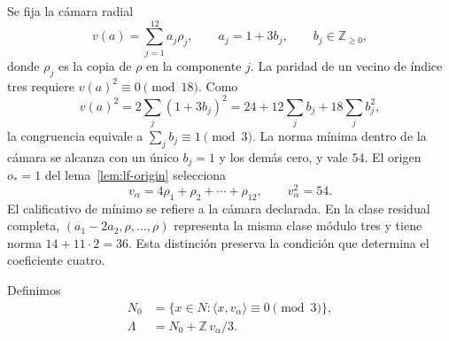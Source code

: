 \documentclass[a4paper,10pt]{article}
\theoremstyle{definition}\newtheorem{definition}[theorem]{Definición}
\theoremstyle{remark}\newtheorem{remark}[theorem]{Observación}
\numberwithin{equation}{section}
\begin{document}
Se fija la cámara radial
\[
 v(a)=\sum_{j=1}^{12}a_j\rho_j,\qquad
 a_j=1+3b_j,\qquad b_j\in\mathbb Z_{\geq0},
\]
donde \(\rho_j\) es la copia de \(\rho\) en la
componente \(j\). La paridad de un vecino de índice
tres requiere \(v(a)^2\equiv0\pmod{18}\).
Como
\[
 v(a)^2=2\sum_j(1+3b_j)^2
       =24+12\sum_jb_j+18\sum_jb_j^2,
\]
la congruencia equivale a \(\sum_jb_j\equiv1\pmod3\).
La norma mínima dentro de la cámara se alcanza con
un único \(b_j=1\) y los demás cero, y vale \(54\).
El origen \(o_*=1\) del lema~\ref{lem:lf-origin}
selecciona
\begin{equation}
 v_\alpha=4\rho_1+\rho_2+\cdots+\rho_{12},
 \qquad v_\alpha^2=54.
 \label{eq:lf-valpha}
\end{equation}
El calificativo de mínimo se refiere a la cámara
declarada. En la clase residual completa,
\((a_1-2a_2,\rho,\ldots,\rho)\) representa la
misma clase módulo tres y tiene norma
\(14+11\cdot2=36\). Esta distinción preserva
la condición que determina el coeficiente cuatro.

Definimos
\begin{equation}
\begin{split}
 N_0&=\{x\in N:\langle x,v_\alpha\rangle\equiv0\pmod3\},\\
 \Lambda&=N_0+\mathbb Z\,v_\alpha/3.
\end{split}
\label{eq:lf-lambda}
\end{equation}
\end{document}
